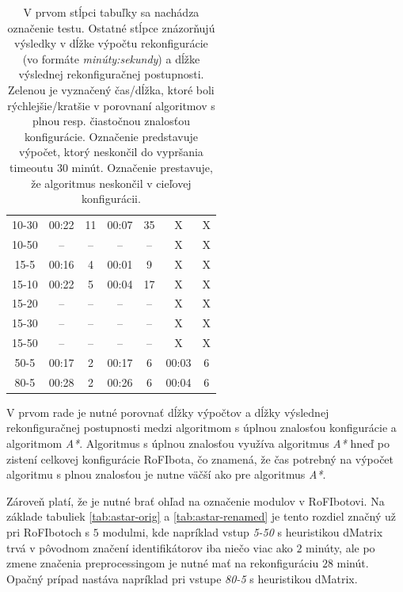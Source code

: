 \documentclass[
  printed, %
  oneside, %
  notable,   %
  nolof,     %
  nolot,     %
]{fithesis3}
\begin{document}
\begin{table}[hp!]
\begin{tabular}{c|cc|cc|cc}
10-30  & \cellcolor{table-green}00:22 & \cellcolor{table-green}11  & 00:07 & 35  & X & X \\
10-50  & -- & --  & -- & --  & X & X \\ \hline
15-5  & \cellcolor{table-green}00:16 & \cellcolor{table-green}4  & 00:01 & 9  & X & X  \\
15-10  & \cellcolor{table-green}00:22 & \cellcolor{table-green}5  & 00:04 & 17  & X & X \\
15-20  & -- & --  & -- & --  & X & X \\
15-30  & -- & --  & -- & --  & X & X \\
15-50  & -- & --  & -- & --  & X & X \\ \hline
50-5  & 00:17 & \cellcolor{table-green}2  & 00:17 & 6  & \cellcolor{table-green}00:03 & 6 \\ \hline
80-5  & 00:28 & \cellcolor{table-green}2  & 00:26 & 6  & \cellcolor{table-green}00:04 & 6 \\
\end{tabular}%
\caption{V prvom stĺpci tabuľky sa nachádza označenie testu. Ostatné stĺpce znázorňujú výsledky v dĺžke výpočtu rekonfigurácie (vo formáte \textit{minúty:sekundy}) a dĺžke výslednej rekonfiguračnej postupnosti. \\ \colorbox{table-green}{Zelenou} je vyznačený čas/dĺžka, ktoré boli rýchlejšie/kratšie v porovnaní algoritmov s plnou resp. čiastočnou znalosťou konfigurácie. Označenie \mbox{\uv{--}} predstavuje výpočet, ktorý neskončil do vypršania timeoutu 30 minút. Označenie  prestavuje, že algoritmus neskončil v cieľovej konfigurácii. }
\label{tab:all}
\end{table}

V prvom rade je nutné porovnať dĺžky výpočtov a dĺžky výslednej rekonfiguračnej postupnosti medzi algoritmom s úplnou znalosťou konfigurácie a algoritmom \textit{A*}. Algoritmus s úplnou znalosťou využíva algoritmus \textit{A*} hneď po zistení celkovej konfigurácie RoFIbota, čo znamená, že čas potrebný na výpočet algoritmu s plnou znalosťou je nutne väčší ako pre algoritmus \textit{A*}. 

Zároveň platí, že je nutné brať ohľad na označenie modulov v RoFIbotovi. Na základe tabuliek \ref{tab:astar-orig} a \ref{tab:astar-renamed} je tento rozdiel značný už pri RoFIbotoch s $5$ modulmi, kde napríklad vstup \textit{5-50} s heuristikou dMatrix trvá v pôvodnom značení identifikátorov iba niečo viac ako $2$ minúty, ale po zmene značenia preprocessingom je nutné mať na rekonfiguráciu $28$ minút. Opačný prípad nastáva napríklad pri vstupe \textit{80-5} s heuristikou dMatrix. 
\end{document}
